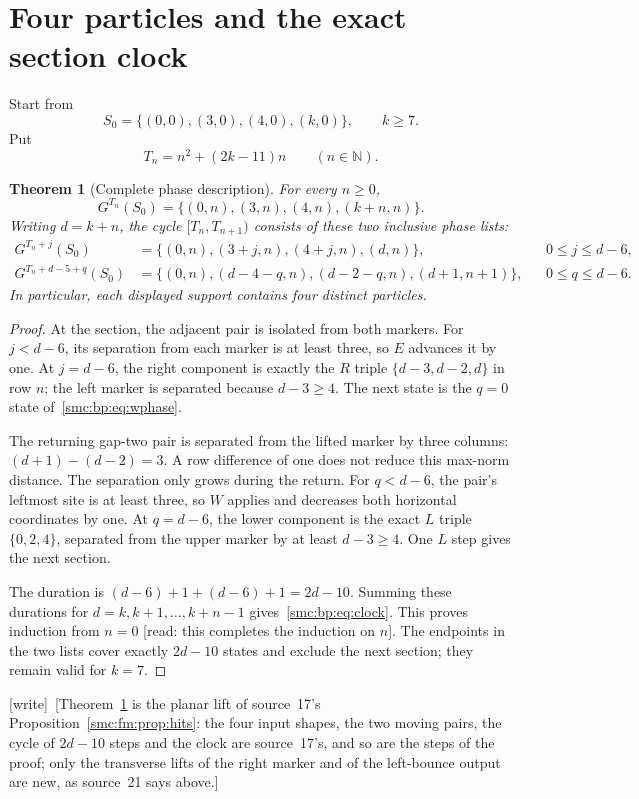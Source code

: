 \documentclass[11pt,letterpaper]{article}
\numberwithin{equation}{section}
\newtheorem{theorem}{Theorem}[section]
\theoremstyle{definition}
\theoremstyle{remark}
\newcommand{\NN}{\mathbb N}
\newcommand{\wtag}{\textup{[write]}}
\begin{document}
\section{Four particles and the exact section clock}\label{smc:bp:sec:orbit}
Start from
\[
S_0=\{(0,0),(3,0),(4,0),(k,0)\},\qquad k\ge7.
\]
Put
\begin{equation}\label{smc:bp:eq:clock}
T_n=n^2+(2k-11)n\qquad(n\in\NN).
\end{equation}
\begin{theorem}[Complete phase description]\label{smc:bp:thm:orbit}
For every $n\ge0$,
\[
G^{T_n}(S_0)=\{(0,n),(3,n),(4,n),(k+n,n)\}.
\]
Writing $d=k+n$, the cycle $[T_n,T_{n+1})$ consists of these two inclusive phase lists:
\begin{align}
G^{T_n+j}(S_0)&=\{(0,n),(3+j,n),(4+j,n),(d,n)\},
&&0\le j\le d-6,\label{smc:bp:eq:ephase}\\
G^{T_n+d-5+q}(S_0)&=\{(0,n),(d-4-q,n),(d-2-q,n),(d+1,n+1)\},
&&0\le q\le d-6.\label{smc:bp:eq:wphase}
\end{align}
In particular, each displayed support contains four distinct particles.
\end{theorem}
\begin{proof}
At the section, the adjacent pair is isolated from both markers. For $j<d-6$, its separation from each marker is at least three, so $E$ advances it by one. At $j=d-6$, the right component is exactly the $R$ triple $\{d-3,d-2,d\}$ in row $n$; the left marker is separated because $d-3\ge4$. The next state is the $q=0$ state of~\eqref{smc:bp:eq:wphase}.

The returning gap-two pair is separated from the lifted marker by three columns: $(d+1)-(d-2)=3$. A row difference of one does not reduce this max-norm distance. The separation only grows during the return. For $q<d-6$, the pair's leftmost site is at least three, so $W$ applies and decreases both horizontal coordinates by one. At $q=d-6$, the lower component is the exact $L$ triple $\{0,2,4\}$, separated from the upper marker by at least $d-3\ge4$. One $L$ step gives the next section.

The duration is $(d-6)+1+(d-6)+1=2d-10$. Summing these durations for $d=k,k+1,\ldots,k+n-1$ gives~\eqref{smc:bp:eq:clock}. This proves induction from $n=0$ \textup{[read: this completes the induction on $n$]}. The endpoints in the two lists cover exactly $2d-10$ states and exclude the next section; they remain valid for $k=7$.
\end{proof}
\wtag\ [Theorem~\ref{smc:bp:thm:orbit} is the planar lift of source~17's Proposition~\ref{smc:fm:prop:hits}: the four input shapes, the two moving pairs, the cycle of $2d-10$ steps and the clock are source~17's, and so are the steps of the proof; only the transverse lifts of the right marker and of the left-bounce output are new, as source~21 says above.]
\end{document}
